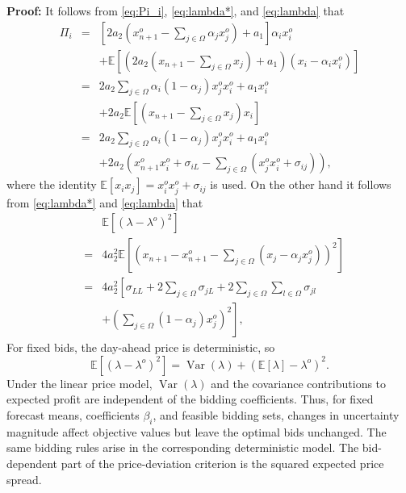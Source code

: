 \documentclass[journal]{IEEEtran}
\begin{document}
\noindent \textbf{Proof:} It follows from \eqref{eq:Pi_i},  \eqref{eq:lambda*}, and \eqref{eq:lambda} that 
\begin{eqnarray}
\Pi_i & = & \left[ 2a_2\left(x_{n+1}^o-\sum_{j\in\Omega} \alpha_j x_j^o 
  \right) +a_1 \right] \alpha_i x_i^o \nonumber \\ && 
  + \mathbb{E}\left[\left(2a_2\left(x_{n+1}-\sum_{j\in\Omega} x_j \right) + a_1\right) (x_i - \alpha_i x_i^o)\right] \nonumber \\
  & = & 2a_2\sum_{j\in\Omega}\alpha_i(1-\alpha_j)x_j^o x_i^o +a_1 x_i^o  \nonumber \\ 
  && + 2a_2\mathbb{E}\left[\left(x_{n+1}-\sum_{j\in\Omega} x_j \right) x_i\right] \nonumber\\
   & = & 2a_2\sum_{j\in\Omega}\alpha_i(1-\alpha_j)x_j^o x_i^o +a_1 x_i^o  \nonumber \\ 
  && + 2a_2\left(x_{n+1}^o x_i^o + \sigma_{iL}- \sum_{j\in\Omega} (x_j^o  x_i^o+ \sigma_{ij})\right), \label{eq:Pi_j_exp}
\end{eqnarray}
where the identity $\mathbb{E}[x_ix_j]=x_i^ox_j^o+\sigma_{ij}$ is used. On the other hand it follows from \eqref{eq:lambda*} and \eqref{eq:lambda} that 
\begin{eqnarray} 
&& \mathbb{E}[(\lambda - \lambda^o)^2] \nonumber \\
& = & 
4a_2^2  \mathbb{E}\left[\left(x_{n+1}-x_{n+1}^o -\sum_{j\in\Omega} (x_j-\alpha_j x_j^o)\right)^2\right] \nonumber \\
& = & 4a_2^2\left[\sigma_{LL} + 2\sum_{j\in\Omega} \sigma_{jL} + 2 \sum_{j\in\Omega} \sum_{l\in\Omega} \sigma_{jl} \right. \nonumber \\
&& \left.+ \left(\sum_{j\in\Omega} (1-\alpha_j) x_j^o\right)^2 \right]
, \label{eq:sigma_lambda}
\end{eqnarray}
For fixed bids, the day-ahead price is deterministic, so
\[
\mathbb{E}[(\lambda-\lambda^o)^2]
=\operatorname{Var}(\lambda)+(\mathbb{E}[\lambda]-\lambda^o)^2.
\]
Under the linear price model, $\operatorname{Var}(\lambda)$ and the covariance contributions to expected profit are independent of the bidding coefficients. Thus, for fixed forecast means, coefficients $\beta_i$, and feasible bidding sets, changes in uncertainty magnitude affect objective values but leave the optimal bids unchanged. The same bidding rules arise in the corresponding deterministic model. The bid-dependent part of the price-deviation criterion is the squared expected price spread.
\end{document}
